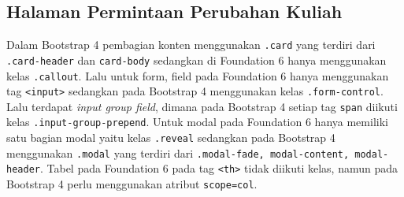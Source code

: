 \subsection{Halaman Permintaan Perubahan Kuliah}
Dalam Bootstrap 4 pembagian konten menggunakan \texttt{.card} yang terdiri dari \texttt{.card-header} dan \texttt{card-body} sedangkan di Foundation 6 hanya menggunakan kelas \texttt{.callout}. 
Lalu untuk form, field pada Foundation 6 hanya menggunakan tag \texttt{<input>} sedangkan pada Bootstrap 4 menggunakan kelas \texttt{.form-control}.
Lalu terdapat \textit{input group field}, dimana pada Bootstrap 4 setiap tag \texttt{span} diikuti kelas \texttt{.input-group-prepend}.
Untuk modal pada Foundation 6 hanya memiliki satu bagian modal yaitu kelas \texttt{.reveal} sedangkan pada Bootstrap 4 menggunakan \texttt{.modal} yang terdiri dari \texttt{.modal-fade, modal-content, modal-header}.
Tabel pada Foundation 6 pada tag \texttt{<th>} tidak diikuti kelas, namun pada Bootstrap 4 perlu menggunakan atribut \texttt{scope=col}.
